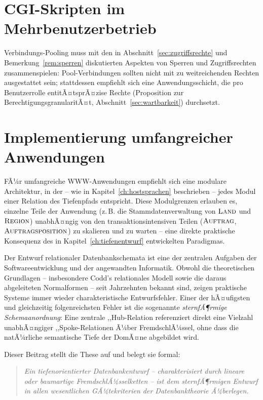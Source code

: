 ﻿\documentclass[a4paper,12pt]{report}
\theoremstyle{definition}
\theoremstyle{remark}
\begin{document}
\section{CGI-Skripten im Mehrbenutzerbetrieb}

Verbindungs-Pooling muss mit den in
Abschnitt~\ref{sec:zugriffsrechte} und
Bemerkung~\ref{rem:sperren} diskutierten Aspekten von Sperren und
Zugriffsrechten zusammenspielen: Pool-Verbindungen sollten nicht mit
zu weitreichenden Rechten ausgestattet sein; stattdessen empfiehlt
sich eine Anwendungsschicht, die pro Benutzerrolle entitÃ¤tsprÃ¤zise
Rechte (Proposition zur BerechtigungsgranularitÃ¤t,
Abschnitt~\ref{sec:wartbarkeit}) durchsetzt.

\section{Implementierung umfangreicher Anwendungen}

FÃ¼r umfangreiche WWW-Anwendungen empfiehlt sich eine modulare
Architektur, in der -- wie in Kapitel~\ref{ch:hostsprachen}
beschrieben -- jedes Modul einer Relation des Tiefenpfads entspricht.
Diese Modulgrenzen erlauben es, einzelne Teile der Anwendung (z.\,B.
die Stammdatenverwaltung von $\textsc{Land}$ und $\textsc{Region}$)
unabhÃ¤ngig von den transaktionsintensiven Teilen
($\textsc{Auftrag}$, $\textsc{Auftragsposition}$) zu skalieren und zu
warten -- eine direkte praktische Konsequenz des in
Kapitel~\ref{ch:tiefenentwurf} entwickelten Paradigmas.

\label{ch:tiefenentwurf}

\label{sec:einleitung}

Der Entwurf relationaler Datenbankschemata ist eine der zentralen Aufgaben der
Softwareentwicklung und der angewandten Informatik. Obwohl die theoretischen
Grundlagen -- insbesondere Codd's relationales Modell \cite{Codd1970} sowie die
daraus abgeleiteten Normalformen \cite{Codd1974, Date2003} -- seit Jahrzehnten
bekannt sind, zeigen praktische Systeme immer wieder charakteristische
Entwurfsfehler. Einer der hÃ¤ufigsten und gleichzeitig folgenreichsten Fehler ist
die sogenannte \emph{sternfÃ¶rmige Schemaanordnung}: Eine zentrale
,,Hub\grqq{}-Relation referenziert direkt eine Vielzahl unabhÃ¤ngiger
,,Spoke\grqq{}-Relationen Ã¼ber FremdschlÃ¼ssel, ohne dass die natÃ¼rliche semantische
Tiefe der DomÃ¤ne abgebildet wird.

Dieser Beitrag stellt die These auf und belegt sie formal:
\begin{quote}
\emph{Ein tiefenorientierter Datenbankentwurf -- charakterisiert durch lineare
oder baumartige FremdschlÃ¼sselketten -- ist dem sternfÃ¶rmigen Entwurf in allen
wesentlichen GÃ¼tekriterien der Datenbanktheorie Ã¼berlegen.}
\end{quote}
\end{document}
